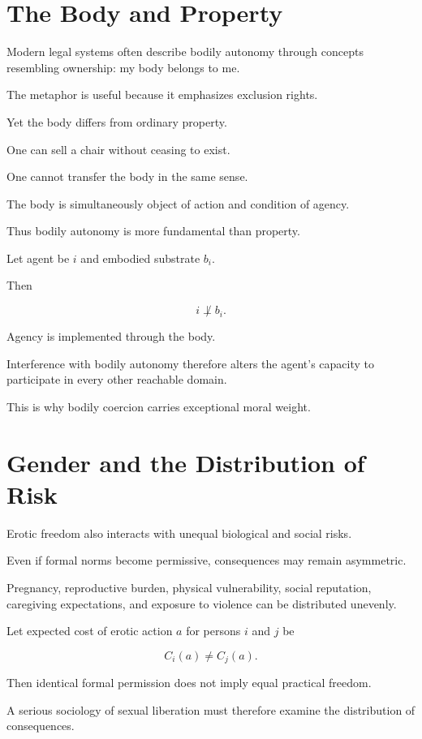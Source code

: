 \documentclass[11pt,oneside]{book}
\theoremstyle{definition}
\theoremstyle{remark}
\begin{document}
\section{The Body and Property}

Modern legal systems often describe bodily autonomy through concepts resembling ownership: my body belongs to me.

The metaphor is useful because it emphasizes exclusion rights.

Yet the body differs from ordinary property.

One can sell a chair without ceasing to exist.

One cannot transfer the body in the same sense.

The body is simultaneously object of action and condition of agency.

Thus bodily autonomy is more fundamental than property.

Let agent be \(i\) and embodied substrate \(b_i\).

Then

\[
i\not\perp b_i.
\]

Agency is implemented through the body.

Interference with bodily autonomy therefore alters the agent's capacity to participate in every other reachable domain.

This is why bodily coercion carries exceptional moral weight.

\section{Gender and the Distribution of Risk}

Erotic freedom also interacts with unequal biological and social risks.

Even if formal norms become permissive, consequences may remain asymmetric.

Pregnancy, reproductive burden, physical vulnerability, social reputation, caregiving expectations, and exposure to violence can be distributed unevenly.

Let expected cost of erotic action \(a\) for persons \(i\) and \(j\) be

\[
C_i(a)
\neq
C_j(a).
\]

Then identical formal permission does not imply equal practical freedom.

A serious sociology of sexual liberation must therefore examine the distribution of consequences.
\end{document}
